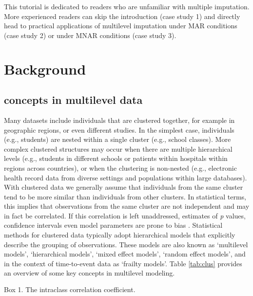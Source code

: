 \documentclass[
  article]{jss}
\begin{document}
This tutorial is dedicated to readers who are unfamiliar with multiple
imputation. More experienced readers can skip the introduction (case
study 1) and directly head to practical applications of multilevel
imputation under MAR conditions (case study 2) or under MNAR conditions
(case study 3).

\hypertarget{sec-models}{%
\section{Background}\label{sec-models}}

\hypertarget{concepts-in-multilevel-data}{%
\subsection{concepts in multilevel
data}\label{concepts-in-multilevel-data}}

Many datasets include individuals that are clustered together, for
example in geographic regions, or even different studies. In the
simplest case, individuals (e.g., students) are nested within a single
cluster (e.g., school classes). More complex clustered structures may
occur when there are multiple hierarchical levels (e.g., students in
different schools or patients within hospitals within regions across
countries), or when the clustering is non-nested (e.g., electronic
health record data from diverse settings and populations within large
databases). With clustered data we generally assume that individuals
from the same cluster tend to be more similar than individuals from
other clusters. In statistical terms, this implies that observations
from the same cluster are not independent and may in fact be correlated.
If this correlation is left unaddressed, estimates of \emph{p} values,
confidence intervals even model parameters are prone to bias
\citep{loca01}. Statistical methods for clustered data typically adopt
hierarchical models that explicitly describe the grouping of
observations. These models are also known as `multilevel models',
`hierarchical models', `mixed effect models', `random effect models',
and in the context of time-to-event data as `frailty models'. Table
\ref{tab:clus} provides an overview of some key concepts in multilevel
modeling.

\begin{tcolorbox}[enhanced jigsaw, breakable, toprule=.15mm, arc=.35mm, bottomrule=.15mm, leftrule=.75mm, colframe=quarto-callout-color-frame, opacityback=0, colback=white, rightrule=.15mm, left=2mm]

Box 1. The intraclass correlation coefficient.

\end{tcolorbox}
\end{document}
